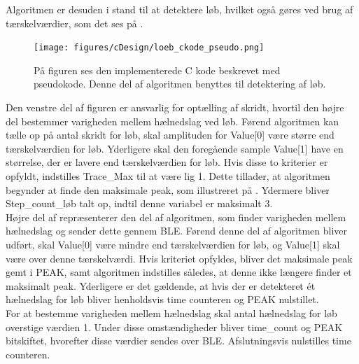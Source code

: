 Algoritmen er desuden i stand til at detektere løb, hvilket også gøres ved brug af tærskelværdier, som det ses på .
\begin{figure}[H]
	\centering
	\texttt{[image: figures/cDesign/loeb\_ckode\_pseudo.png]}
	\caption{ På figuren ses den implementerede C kode beskrevet med pseudokode. Denne del af algoritmen benyttes til detektering af løb.}
	\label{fig:loeb_pseudo}
\end{figure} \vspace{-0.5cm}
Den venstre del af figuren er ansvarlig for optælling af skridt, hvortil den højre del bestemmer varigheden mellem hælnedslag ved løb. Førend algoritmen kan tælle op på antal skridt for løb, skal amplituden for Value[0] være større end tærskelværdien for løb. Yderligere skal den foregående sample Value[1] have en størrelse, der er lavere end tærskelværdien for løb. Hvis disse to kriterier er opfyldt, indstilles Trace\_Max til at være lig 1. Dette tillader, at algoritmen begynder at finde den maksimale peak, som illustreret på . Ydermere bliver Step\_count\_løb talt op, indtil denne variabel er maksimalt 3. \\
Højre del af  repræsenterer den del af algoritmen, som finder varigheden mellem hælnedslag og sender dette gennem BLE. Førend denne del af algoritmen bliver udført, skal Value[0] være mindre end tærskelværdien for løb, og Value[1] skal være over denne tærskelværdi. Hvis kriteriet opfyldes, bliver det maksimale peak gemt i PEAK, samt algoritmen indstilles således, at denne ikke længere finder et maksimalt peak. Yderligere er det gældende, at hvis der er detekteret ét hælnedslag for løb bliver henholdsvis time counteren og PEAK nulstillet. \\
For at bestemme varigheden mellem hælnedslag  skal antal hælnedslag for løb overstige værdien 1. Under disse omstændigheder bliver time\_count og PEAK bitskiftet, hvorefter disse værdier sendes over BLE. Afslutningsvis nulstilles time counteren.

